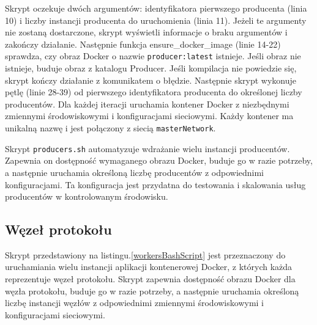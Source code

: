 Skrypt oczekuje dwóch argumentów: identyfikatora pierwszego producenta (linia 10) i liczby instancji producenta do uruchomienia (linia 11). Jeżeli te argumenty nie zostaną dostarczone, skrypt wyświetli informacje o braku argumentów i zakończy działanie. Następnie funkcja ensure\_docker\_image (linie 14-22) sprawdza, czy obraz Docker o nazwie \verb|producer:latest| istnieje. Jeśli obraz nie istnieje, buduje obraz z katalogu Producer. Jeśli kompilacja nie powiedzie się, skrypt kończy działanie z komunikatem o błędzie. Następnie skrypt wykonuje pętlę (linie 28-39) od pierwszego identyfikatora producenta do określonej liczby producentów. Dla każdej iteracji uruchamia kontener Docker z niezbędnymi zmiennymi środowiskowymi i konfiguracjami sieciowymi. Każdy kontener ma unikalną nazwę i jest połączony z siecią \verb|masterNetwork|.

Skrypt \verb|producers.sh| automatyzuje wdrażanie wielu instancji producentów. Zapewnia on dostępność wymaganego obrazu Docker, buduje go w razie potrzeby, a następnie uruchamia określoną liczbę producentów z odpowiednimi konfiguracjami. Ta konfiguracja jest przydatna do testowania i skalowania usług producentów w kontrolowanym środowisku.

\subsection{Węzeł protokołu}

Skrypt przedstawiony na listingu.\ref{workersBashScript} jest przeznaczony do uruchamiania wielu instancji aplikacji kontenerowej Docker, z których każda reprezentuje węzeł protokołu. Skrypt zapewnia dostępność obrazu Docker dla węzła protokołu, buduje go w razie potrzeby, a następnie uruchamia określoną liczbę instancji węzłów z odpowiednimi zmiennymi środowiskowymi i konfiguracjami sieciowymi.

